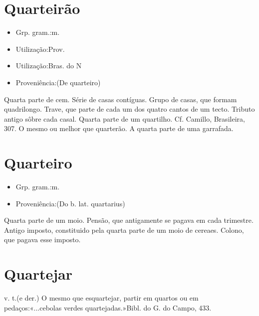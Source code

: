 \section{Quarteirão}
\begin{itemize}
\item {Grp. gram.:m.}
\end{itemize}
\begin{itemize}
\item {Utilização:Prov.}
\end{itemize}
\begin{itemize}
\item {Utilização:Bras. do N}
\end{itemize}
\begin{itemize}
\item {Proveniência:(De \textunderscore quarteiro\textunderscore )}
\end{itemize}
Quarta parte de cem.
Série de casas contíguas.
Grupo de casas, que formam quadrilongo.
Trave, que parte de cada um dos quatro cantos de um tecto.
Tributo antigo sôbre cada casal.
Quarta parte de um quartilho. Cf. Camillo, \textunderscore Brasileira\textunderscore , 307.
O mesmo ou melhor que \textunderscore quarterão\textunderscore .
A quarta parte de uma garrafada.
\section{Quarteiro}
\begin{itemize}
\item {Grp. gram.:m.}
\end{itemize}
\begin{itemize}
\item {Proveniência:(Do b. lat. \textunderscore quartarius\textunderscore )}
\end{itemize}
Quarta parte de um moio.
Pensão, que antigamente se pagava em cada trimestre.
Antigo imposto, constituido pela quarta parte de um moio de cereaes.
Colono, que pagava esse imposto.
\section{Quartejar}
\textunderscore v. t.\textunderscore  (e der.)
O mesmo que \textunderscore esquartejar\textunderscore , partir em quartos ou em pedaços:«\textunderscore ...cebolas verdes quartejadas.\textunderscore »\textunderscore Bibl. do G. do Campo\textunderscore , 433.
